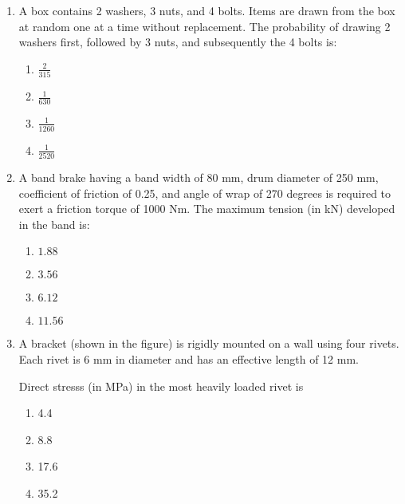 \documentclass[journal,9pt,onecolumn]{IEEEtran}
\begin{document}
\begin{enumerate}
\item A box contains 2 washers, 3 nuts, and 4 bolts. Items are drawn from the box at random one at a time without replacement. The probability of drawing 2 washers first, followed by 3 nuts, and subsequently the 4 bolts is:
\begin{multicols}{4}    
\begin{enumerate}
    \item $ \frac{2}{315} $
    \item $ \frac{1}{630} $
    \item $ \frac{1}{1260} $
    \item $ \frac{1}{2520} $
\end{enumerate}
\end{multicols}


\item A band brake having a band width of 80 mm, drum diameter of 250 mm, coefficient of friction of 0.25, and angle of wrap of 270 degrees is required to exert a friction torque of 1000 Nm. The maximum tension (in kN) developed in the band is:
\begin{multicols}{4}
\begin{enumerate}
    \item $ 1.88 $
    \item $ 3.56 $
    \item $ 6.12 $
    \item $ 11.56 $
\end{enumerate}
\end{multicols}


\item A bracket (shown in the figure) is rigidly mounted on a wall using four rivets. Each rivet is 6 mm in diameter and has an effective length of 12 mm.
\begin{center}
    
\end{center}
Direct stresss (in MPa) in the most heavily loaded rivet is
\begin{multicols}{4}    
\begin{enumerate}
    \item 4.4
    \item 8.8
    \item 17.6
    \item 35.2
\end{enumerate}
\end{multicols}


\end{enumerate}
\end{document}
